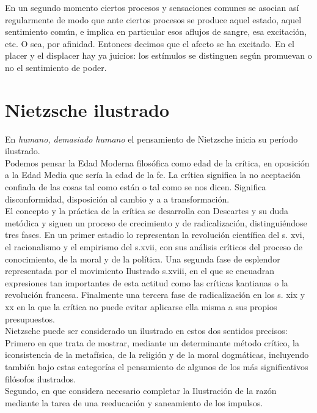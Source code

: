 \documentclass[a4paper, 10pt, twocolumn, spanish]{article}
\begin{document}
En un segundo momento ciertos procesos y sensaciones comunes se
asocian así regularmente de modo que ante ciertos procesos se produce
aquel estado, aquel sentimiento común, e implica en particular esos
aflujos de sangre, esa excitación, etc. O sea, por afinidad. Entonces
decimos que el afecto se ha excitado. En el placer y el displacer hay
ya juicios: los estímulos se distinguen según promuevan o no el
sentimiento de poder.

\section{Nietzsche ilustrado}
\label{sec:org502a45f}
En \emph{humano, demasiado humano} el pensamiento de Nietzsche inicia su
período ilustrado.\\[0pt]

Podemos pensar la Edad Moderna filosófica como edad de la crítica, en
oposición a la Edad Media que sería la edad de la fe. La crítica
significa la no aceptación confiada de las cosas tal como están o tal
como se nos dicen. Significa disconformidad, disposición al cambio y a
a transformación.\\[0pt]

El concepto y la práctica de la crítica se desarrolla con Descartes y
su duda metódica y siguen un proceso de crecimiento y de
radicalización, distinguiéndose tres fases. En un primer estadio lo
representan la revolución científica del s. xvi, el racionalismo y el
empirismo del s.xvii, con sus análisis críticos del proceso de
conocimiento, de la moral y de la política. Una segunda fase de
esplendor representada por el movimiento Ilustrado s.xviii, en el que
se encuadran expresiones tan importantes de esta actitud como las
críticas kantianas o la revolución francesa. Finalmente una tercera
fase de radicalización en los s. xix y xx en la que la crítica no
puede evitar aplicarse ella misma a sus propios presupuestos.\\[0pt]

Nietzsche puede ser considerado un ilustrado en estos dos sentidos
precisos: Primero en que trata de mostrar, mediante un determinante
método crítico, la iconsistencia de la metafísica, de la religión y de
la moral dogmáticas, incluyendo también bajo estas categorías el
pensamiento de algunos de los más significativos filósofos
ilustrados.\\[0pt]
Segundo, en que considera necesario completar la Ilustración de la
razón mediante la tarea de una reeducación y saneamiento de los
impulsos.\\[0pt]
\end{document}
